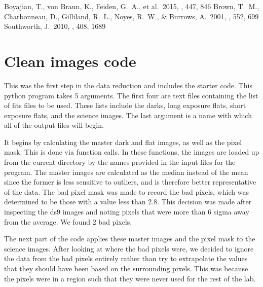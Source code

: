 \documentclass{aastex61}
\begin{document}
\begin{thebibliography}{9}	
	 Boyajian, T., von Braun, K., Feiden, G.~A., et al.\ 2015, \mnras, 447, 846 
	 Brown, T.~M., Charbonneau, D., Gilliland, R.~L., Noyes, R.~W., \& Burrows, A.\ 2001, \apj, 552, 699 
	 Southworth, J.\ 2010, \mnras, 408, 1689 
\end{thebibliography}

\appendix
\section{Clean images code} \label{code: reduction}
This was the first step in the data reduction and includes the starter code. This python program takes 5 arguments. The first four are text files containing the list of fits files to be used. These lists include the darks, long exposure flats, short exposure flats, and the science images. The last argument is a name with which all of the output files will begin. 

It begins by calculating the master dark and flat images, as well as the pixel mask. This is done via function calls. In these functions, the images are loaded up from the current directory by the names provided in the input files for the program. The master images are calculated as the median instead of the mean since the former is less sensitive to outliers, and is therefore better representative of the data. The bad pixel mask was made to record the bad pixels, which was determined to be those with a value less than 2.8. This decision was made after inspecting the ds9 images and noting pixels that were more than 6 sigma away from the average. We found 2 bad pixels.

The next part of the code applies these master images and the pixel mask to the science images. After looking at where the bad pixels were, we decided to ignore the data from the bad pixels entirely rather than try to extrapolate the values that they should have been based on the surrounding pixels. This was because the pixels were in a region such that they were never used for the rest of the lab.
\end{document}
